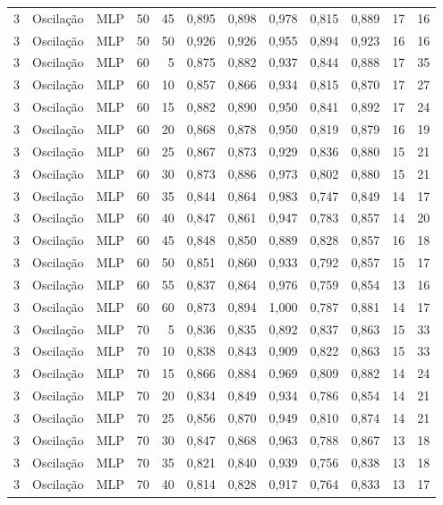 \begin{longtable}{@{}rllrrrrrrrrr@{}}
3 & Oscilação & MLP & 50 & 45 & 0,895 & 0,898 & 0,978 & 0,815 & 0,889 & 17 & 16 \\
3 & Oscilação & MLP & 50 & 50 & 0,926 & 0,926 & 0,955 & 0,894 & 0,923 & 16 & 16 \\
3 & Oscilação & MLP & 60 & 5 & 0,875 & 0,882 & 0,937 & 0,844 & 0,888 & 17 & 35 \\
3 & Oscilação & MLP & 60 & 10 & 0,857 & 0,866 & 0,934 & 0,815 & 0,870 & 17 & 27 \\
3 & Oscilação & MLP & 60 & 15 & 0,882 & 0,890 & 0,950 & 0,841 & 0,892 & 17 & 24 \\
3 & Oscilação & MLP & 60 & 20 & 0,868 & 0,878 & 0,950 & 0,819 & 0,879 & 16 & 19 \\
3 & Oscilação & MLP & 60 & 25 & 0,867 & 0,873 & 0,929 & 0,836 & 0,880 & 15 & 21 \\
3 & Oscilação & MLP & 60 & 30 & 0,873 & 0,886 & 0,973 & 0,802 & 0,880 & 15 & 21 \\
3 & Oscilação & MLP & 60 & 35 & 0,844 & 0,864 & 0,983 & 0,747 & 0,849 & 14 & 17 \\
3 & Oscilação & MLP & 60 & 40 & 0,847 & 0,861 & 0,947 & 0,783 & 0,857 & 14 & 20 \\
3 & Oscilação & MLP & 60 & 45 & 0,848 & 0,850 & 0,889 & 0,828 & 0,857 & 16 & 18 \\
3 & Oscilação & MLP & 60 & 50 & 0,851 & 0,860 & 0,933 & 0,792 & 0,857 & 15 & 17 \\
3 & Oscilação & MLP & 60 & 55 & 0,837 & 0,864 & 0,976 & 0,759 & 0,854 & 13 & 16 \\
3 & Oscilação & MLP & 60 & 60 & 0,873 & 0,894 & 1,000 & 0,787 & 0,881 & 14 & 17 \\
3 & Oscilação & MLP & 70 & 5 & 0,836 & 0,835 & 0,892 & 0,837 & 0,863 & 15 & 33 \\
3 & Oscilação & MLP & 70 & 10 & 0,838 & 0,843 & 0,909 & 0,822 & 0,863 & 15 & 33 \\
3 & Oscilação & MLP & 70 & 15 & 0,866 & 0,884 & 0,969 & 0,809 & 0,882 & 14 & 24 \\
3 & Oscilação & MLP & 70 & 20 & 0,834 & 0,849 & 0,934 & 0,786 & 0,854 & 14 & 21 \\
3 & Oscilação & MLP & 70 & 25 & 0,856 & 0,870 & 0,949 & 0,810 & 0,874 & 14 & 21 \\
3 & Oscilação & MLP & 70 & 30 & 0,847 & 0,868 & 0,963 & 0,788 & 0,867 & 13 & 18 \\
3 & Oscilação & MLP & 70 & 35 & 0,821 & 0,840 & 0,939 & 0,756 & 0,838 & 13 & 18 \\
3 & Oscilação & MLP & 70 & 40 & 0,814 & 0,828 & 0,917 & 0,764 & 0,833 & 13 & 17 \\

\end{longtable}
